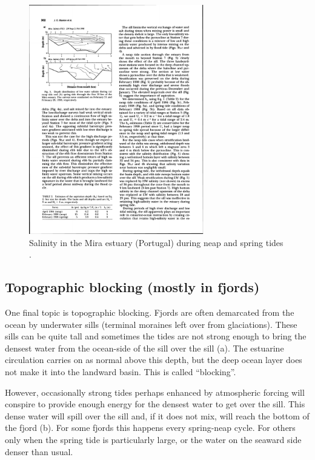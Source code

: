 \begin{figure}[htb]
  \centering
  \includegraphics[width=3in]{figs/BlantonEtAl00Fig5}
  \caption{Salinity in the Mira estuary (Portugal) during neap and spring tides
    \citep{blantonetal00}.}
  \label{fig:BlantonEtAl00Fig5}
\end{figure}

\clearpage
\subsection{Topographic blocking (mostly in fjords)}

One final topic is topographic blocking.  Fjords are often demarcated from the ocean by underwater sills (terminal moraines left over from glaciations).  These sills can be quite tall and sometimes the tides are not strong enough to bring the densest water from the ocean-side of the sill over the sill (a).  The estuarine circulation carries on as normal above this depth, but the deep ocean layer does not make it into the landward basin.  This is called ``blocking''.

However, occasionally strong tides perhaps enhanced by atmospheric forcing will conspire to provide enough energy for the densest water to get over the sill.  This dense water will spill over the sill and, if it does not mix, will reach the bottom of the fjord (b).  For some fjords this happens every spring-neap cycle.  For others only when the spring tide is particularly large, or the water on the seaward side denser than usual.  


